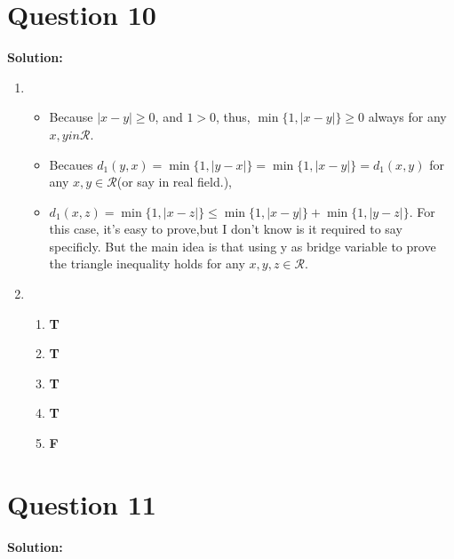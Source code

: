 \documentclass[11pt]{article} %
\begin{document}
\section{Question 10}

\textbf{Solution:}
\begin{enumerate}
\item 
\begin{itemize}
	\item 
	
	Because $|x-y|\geq 0$, and $1>0$, thus, $\min\{ 1, |x-y|\}\geq 0$ always for any $x,y in \mathcal{R}$. 
	
	\item 
	
	Becaues $d_1(y,x)=\min\{1,|y-x|\}=\min\{1,|x-y|\}=d_1(x,y)$ for any $x,y \in \mathcal{R}$(or say in real field.),
	\item $d_1(x,z)= \min \{1,|x-z|\}\leq \min\{1,|x-y|\}+\min \{1,|y-z|\}$. For this case, it's easy to prove,but I don't know is it required to say specificly. But the main idea is that using y as bridge variable to prove the triangle inequality holds for any $x,y,z \in \mathcal{R}$. 
\end{itemize}

\item 

\begin{enumerate}
	\item \textbf{T}
	\item \textbf{T}
	\item \textbf{T}
	\item \textbf{T}
	\item \textbf{F}
\end{enumerate}

\end{enumerate}

\section{Question 11}
\textbf{Solution:}
\end{document}
